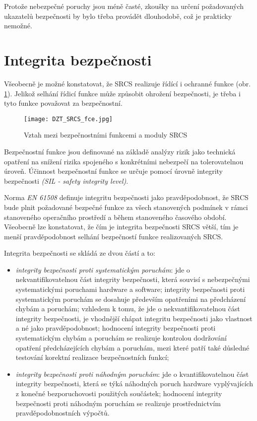       Protože nebezpečné poruchy jsou méně časté, zkoušky na určení požadovaných ukazatelů
      bezpečnosti by bylo třeba provádět dlouhodobě, což je prakticky nemožné. 
    
  \section{Integrita bezpečnosti}
    Všeobecně je možné konstatovat, že SRCS realizuje řídící i ochranné funkce (obr.
    \ref{DZT:fig_DZT_SRCS_fce}). Jelikož selhání řídicí funkce může způsobit ohrožení bezpečnosti,
    je třeba i tyto funkce považovat za bezpečnostní.
    \begin{figure}[hb!]
      \centering
      \texttt{[image: DZT\_SRCS\_fce.jpg]}
      \caption{Vztah mezi bezpečnostními funkcemi a moduly SRCS}
      \label{DZT:fig_DZT_SRCS_fce}
    \end{figure}    
    Bezpečnostní funkce jsou definované na základě analýzy rizik jako technická opatření na snížení
    rizika spojeného s konkrétními nebezpečí na tolerovatelnou úroveň. Účinnost bezpečnostní funkce
    se určuje pomocí úrovně integrity bezpečnosti \emph{(SIL - safety integrity level)}. 
    
    Norma \emph{EN 61508} definuje integritu bezpečnosti jako pravděpodobnost, že SRCS bude plnit 
    požadované bezpečné funkce za všech stanovených podmínek v rámci stanoveného operačního 
    prostředí a během stanoveného časového období. Všeobecně lze konstatovat, že čím je integrita
    bezpečnosti SRCS větší, tím je menší pravděpodobnost selhání bezpečností funkce realizovaných
    SRCS.  
    
    Integrita bezpečnosti se skládá ze dvou částí a to:
    \begin{itemize}
      \item \emph{integrity bezpečnosti proti systematickým poruchám}: jde o nekvantifikovatelnou
            část integrity bezpečnosti, která souvisí s nebezpečnými systematickými poruchami 
            hardware a software; integrity bezpečnosti proti systematickým poruchám se dosahuje
            především opatřeními na předcházení chybám a poruchám; vzhledem k tomu, že jde o 
            nekvantifikovatelnou část integrity bezpečnosti, je vhodnější chápat integritu 
            bezpečnosti jako vlastnost a né jako pravděpodobnost; hodnocení integrity bezpečnosti
            proti systematickým chybám a poruchám se realizuje kontrolou dodržování opatření
            předcházejících chybám a poruchám, mezi které patří také důsledné testování korektní
            realizace bezpečnostních funkcí; 
      \item \emph{integrity bezpečnosti proti náhodným poruchám}: jde o kvantifikovatelnou část
            integrity bezpečnosti, která se týká náhodných poruch hardware vyplývajících z konečné
            bezporuchovosti použitých součástek; hodnocení integrity bezpečnosti proti náhodným
            poruchám se realizuje prostřednictvím pravděpodobnostních výpočtů.
    \end{itemize}
    
